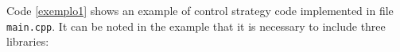 Code \ref{exemplo1} shows an example of control strategy code implemented in file \texttt{main.cpp}. It can be noted in the example that it is necessary to include three libraries:

%	
%	
%	
%

